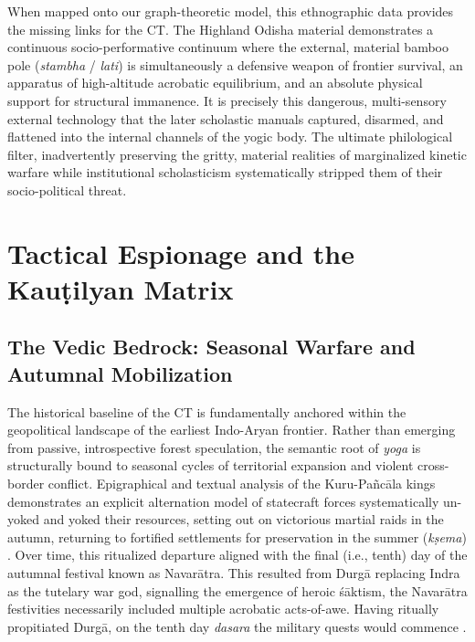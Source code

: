 \documentclass[11pt,twoside,letterpaper]{article}
\begin{document}
When mapped onto our graph-theoretic model, this ethnographic data provides the missing links for the CT. The Highland Odisha material demonstrates a continuous socio-performative continuum where the external, material bamboo pole (\textit{stambha} / \textit{lati}) is simultaneously a defensive weapon of frontier survival, an apparatus of high-altitude acrobatic equilibrium, and an absolute physical support for structural immanence. It is precisely this dangerous, multi-sensory external technology that the later scholastic manuals captured, disarmed, and flattened into the internal channels of the yogic body. The ultimate philological filter, inadvertently preserving the gritty, material realities of marginalized kinetic warfare while institutional scholasticism systematically stripped them of their socio-political threat.



\section{Tactical Espionage and the Kauṭilyan Matrix}
\label{sec:tactical_espionage_kautilyan_matrix}

\subsection{The Vedic Bedrock: Seasonal Warfare and Autumnal Mobilization}

The historical baseline of the CT is fundamentally anchored within the geopolitical landscape of the earliest Indo-Aryan frontier. Rather than emerging from passive, introspective forest speculation, the semantic root of \textit{yoga} is structurally bound to seasonal cycles of territorial expansion and violent cross-border conflict. Epigraphical and textual analysis of the Kuru-Pañcāla kings demonstrates an explicit alternation model of statecraft forces systematically un-yoked and yoked their resources, setting out on victorious martial raids in the autumn, returning to fortified settlements for preservation in the summer (\textit{kṣema}) \citep{oberlies2024, witzel1997, witzel2023}. Over time, this ritualized departure aligned with the final (i.e., tenth) day of the autumnal festival known as Navarātra. This resulted from Durgā replacing Indra as the tutelary war god, signalling the emergence of heroic śāktism, the Navarātra festivities necessarily included multiple acrobatic acts-of-awe. Having ritually propitiated Durgā, on the tenth day \textit{dasara} the military quests would commence \citep{suebsantiwongse2023, sarkar2020, sarkar2017}. 
\end{document}
